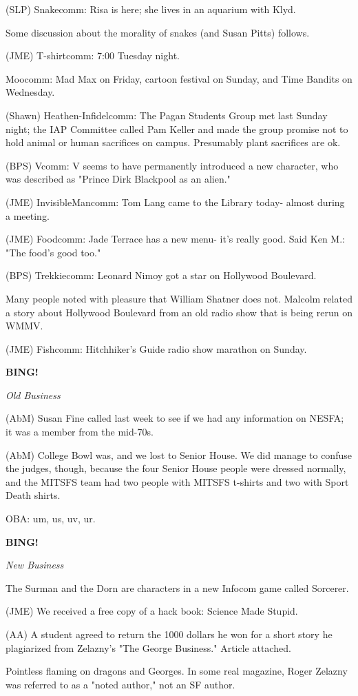 \documentclass[12pt]{article}
\newcommand{\bing}{{\bf BING!} }
\newcommand{\goto}[1]{\bing \vskip 12pt \centerline{{\em{#1}}}}
\begin{document}
(SLP) Snakecomm: Risa is here; she lives in an aquarium with Klyd.

Some discussion about the morality of snakes (and Susan Pitts) follows.

(JME) T-shirtcomm: 7:00 Tuesday night.

Moocomm: Mad Max on Friday, cartoon festival on Sunday, and Time Bandits on Wednesday.

(Shawn) Heathen-Infidelcomm: The Pagan Students Group met last Sunday night; the IAP Committee called Pam Keller and made the group promise not to hold animal or human sacrifices on campus. Presumably plant sacrifices are ok.

(BPS) Vcomm: V seems to have permanently introduced a new character, who was described as "Prince Dirk Blackpool as an alien."

(JME) InvisibleMancomm: Tom Lang came to the Library today- almost during a meeting.

(JME) Foodcomm: Jade Terrace has a new menu- it's really good. Said Ken M.: "The food's good too."

(BPS) Trekkiecomm: Leonard Nimoy got a star on Hollywood Boulevard.

Many people noted with pleasure that William Shatner does not. Malcolm related a story about Hollywood Boulevard from an old radio show that is being rerun on WMMV.

(JME) Fishcomm: Hitchhiker's Guide radio show marathon on Sunday.

\goto{Old Business}

(AbM) Susan Fine called last week to see if we had any information on NESFA; it was a member from the mid-70s.

(AbM) College Bowl was, and we lost to Senior House. We did manage to confuse the judges, though, because the four Senior House people were dressed normally, and the MITSFS team had two people with MITSFS t-shirts and two with Sport Death shirts.

OBA: um, us, uv, ur.

\goto{New Business}

The Surman and the Dorn are characters in a new Infocom game called Sorcerer.

(JME) We received a free copy of a hack book: Science Made Stupid.

(AA) A student agreed to return the 1000 dollars he won for a short story he plagiarized from Zelazny's "The George Business." Article attached.

Pointless flaming on dragons and Georges. In some real magazine, Roger Zelazny was referred to as a "noted author," not an SF author.
\end{document}

